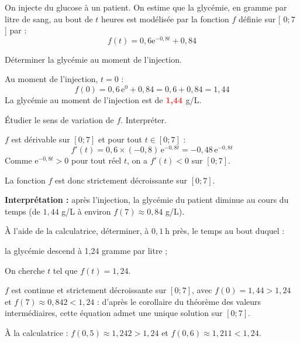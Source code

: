 \documentclass[11pt,a4paper]{article}  %
\begin{document}
	\exerciceDS{}
	
	On injecte du glucose à un patient.
	On estime que la glycémie, en gramme par litre de sang, au bout de $t$ heures est modélisée par la fonction $f$ définie sur [ $0 ; 7$ ] par :
	$$
	f(t)=0,6 \mathrm{e}^{-0,8 t}+0,84
	$$
	
	\begin{enumMet}
		\item Déterminer la glycémie au moment de l'injection.
		
		\begin{corrBox}
			Au moment de l'injection, $t=0$ :
			\[f(0)=0{,}6\,\mathrm{e}^{0}+0{,}84=0{,}6+0{,}84=1{,}44\]
			La glycémie au moment de l'injection est de $\mRouge{1{,}44}$ g/L.
		\end{corrBox}
		
		\item Étudier le sens de variation de $f$. Interpréter.
		
		\begin{corrBox}
			$f$ est dérivable sur $[0;7]$ et pour tout $t\in[0;7]$ :
			\[f'(t)=0{,}6\times(-0{,}8)\,\mathrm{e}^{-0{,}8t}=-0{,}48\,\mathrm{e}^{-0{,}8t}\]
			Comme $\mathrm{e}^{-0{,}8t}>0$ pour tout réel $t$, on a $f'(t)<0$ sur $[0;7]$.
			
			La fonction $f$ est donc strictement décroissante sur $[0;7]$.
			
			\textbf{Interprétation :} après l'injection, la glycémie du patient diminue au cours du temps (de $1{,}44$ g/L à environ $f(7)\approx0{,}84$ g/L).
		\end{corrBox}
		
		\item À l'aide de la calculatrice, déterminer, à $0,1 \mathrm{~h}$ près, le temps au bout duquel :
		\begin{enumMet}
			\item la glycémie descend à 1,24 gramme par litre ;
			
			\begin{corrBox}
				On cherche $t$ tel que $f(t)=1{,}24$.
				
				$f$ est continue et strictement décroissante sur $[0;7]$, avec $f(0)=1{,}44>1{,}24$ et $f(7)\approx0{,}842<1{,}24$ : d'après le corollaire du théorème des valeurs intermédiaires, cette équation admet une unique solution sur $[0;7]$.
				
				À la calculatrice : $f(0{,}5)\approx1{,}242>1{,}24$ et $f(0{,}6)\approx1{,}211<1{,}24$.
				

\end{corrBox}
\end{enumMet}
\end{enumMet}
\end{document}
